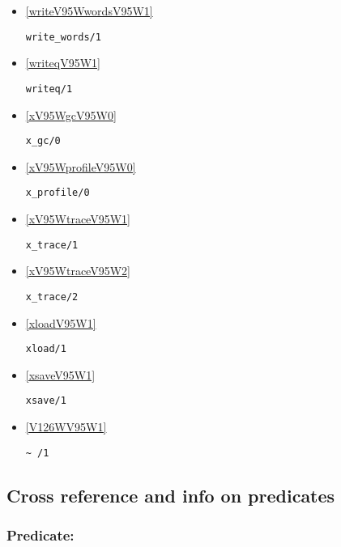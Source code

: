 \begin{itemize}
\item \ref{writeV95WwordsV95W1} 
\begin{verbatim}
write_words/1
\end{verbatim}

\item \ref{writeqV95W1} 
\begin{verbatim}
writeq/1
\end{verbatim}

\item \ref{xV95WgcV95W0} 
\begin{verbatim}
x_gc/0
\end{verbatim}

\item \ref{xV95WprofileV95W0} 
\begin{verbatim}
x_profile/0
\end{verbatim}

\item \ref{xV95WtraceV95W1} 
\begin{verbatim}
x_trace/1
\end{verbatim}

\item \ref{xV95WtraceV95W2} 
\begin{verbatim}
x_trace/2
\end{verbatim}

\item \ref{xloadV95W1} 
\begin{verbatim}
xload/1
\end{verbatim}

\item \ref{xsaveV95W1} 
\begin{verbatim}
xsave/1
\end{verbatim}

\item \ref{V126WV95W1} 
\begin{verbatim}
~ /1
\end{verbatim}

\end{itemize}
\subsection{Cross reference and info on predicates} \label{bppreds}

\subsubsection{Predicate:} \label{V35WV95W3}

